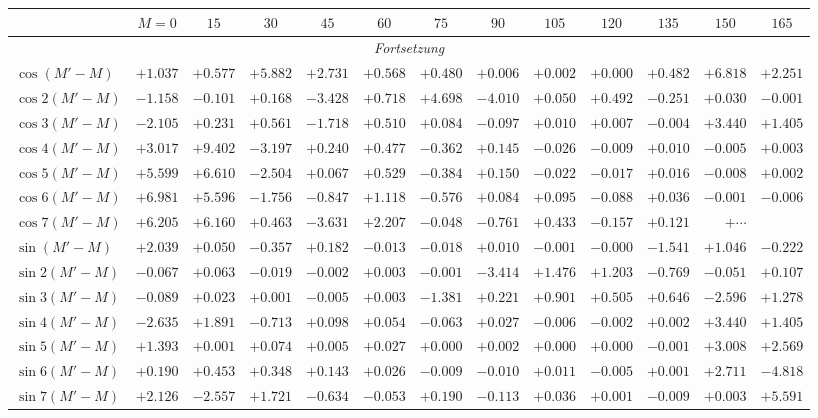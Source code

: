 \documentclass[12pt,a4paper]{article}
\begin{document}
\small
\begin{longtable}{@{}l|rrrrrrrrrrrr@{}}
\multicolumn{1}{c|}{} & \multicolumn{1}{c}{$M=0$} & \multicolumn{1}{c}{$15$} & \multicolumn{1}{c}{$30$} & \multicolumn{1}{c}{$45$} & \multicolumn{1}{c}{$60$} & \multicolumn{1}{c}{$75$} & \multicolumn{1}{c}{$90$} & \multicolumn{1}{c}{$105$} & \multicolumn{1}{c}{$120$} & \multicolumn{1}{c}{$135$} & \multicolumn{1}{c}{$150$} & \multicolumn{1}{c}{$165$}\\
\midrule
\endfirsthead
\multicolumn{13}{c}{\textit{Fortsetzung}}\\
\midrule
\endhead
$\cos(M'-M)$ & $+1.037$ & $+0.577$ & $+5.882$ & $+2.731$ & $+0.568$ & $+0.480$ & $+0.006$ & $+0.002$ & $+0.000$ & $+0.482$ & $+6.818$ & $+2.251$\\
$\cos 2(M'-M)$ & $-1.158$ & $-0.101$ & $+0.168$ & $-3.428$ & $+0.718$ & $+4.698$ & $-4.010$ & $+0.050$ & $+0.492$ & $-0.251$ & $+0.030$ & $-0.001$\\
$\cos 3(M'-M)$ & $-2.105$ & $+0.231$ & $+0.561$ & $-1.718$ & $+0.510$ & $+0.084$ & $-0.097$ & $+0.010$ & $+0.007$ & $-0.004$ & $+3.440$ & $+1.405$\\
$\cos 4(M'-M)$ & $+3.017$ & $+9.402$ & $-3.197$ & $+0.240$ & $+0.477$ & $-0.362$ & $+0.145$ & $-0.026$ & $-0.009$ & $+0.010$ & $-0.005$ & $+0.003$\\
$\cos 5(M'-M)$ & $+5.599$ & $+6.610$ & $-2.504$ & $+0.067$ & $+0.529$ & $-0.384$ & $+0.150$ & $-0.022$ & $-0.017$ & $+0.016$ & $-0.008$ & $+0.002$\\
$\cos 6(M'-M)$ & $+6.981$ & $+5.596$ & $-1.756$ & $-0.847$ & $+1.118$ & $-0.576$ & $+0.084$ & $+0.095$ & $-0.088$ & $+0.036$ & $-0.001$ & $-0.006$\\
$\cos 7(M'-M)$ & $+6.205$ & $+6.160$ & $+0.463$ & $-3.631$ & $+2.207$ & $-0.048$ & $-0.761$ & $+0.433$ & $-0.157$ & $+0.121$ & $+\cdots$ & \\
\midrule
$\sin(M'-M)$ & $+2.039$ & $+0.050$ & $-0.357$ & $+0.182$ & $-0.013$ & $-0.018$ & $+0.010$ & $-0.001$ & $-0.000$ & $-1.541$ & $+1.046$ & $-0.222$\\
$\sin 2(M'-M)$ & $-0.067$ & $+0.063$ & $-0.019$ & $-0.002$ & $+0.003$ & $-0.001$ & $-3.414$ & $+1.476$ & $+1.203$ & $-0.769$ & $-0.051$ & $+0.107$\\
$\sin 3(M'-M)$ & $-0.089$ & $+0.023$ & $+0.001$ & $-0.005$ & $+0.003$ & $-1.381$ & $+0.221$ & $+0.901$ & $+0.505$ & $+0.646$ & $-2.596$ & $+1.278$\\
$\sin 4(M'-M)$ & $-2.635$ & $+1.891$ & $-0.713$ & $+0.098$ & $+0.054$ & $-0.063$ & $+0.027$ & $-0.006$ & $-0.002$ & $+0.002$ & $+3.440$ & $+1.405$\\
$\sin 5(M'-M)$ & $+1.393$ & $+0.001$ & $+0.074$ & $+0.005$ & $+0.027$ & $+0.000$ & $+0.002$ & $+0.000$ & $+0.000$ & $-0.001$ & $+3.008$ & $+2.569$\\
$\sin 6(M'-M)$ & $+0.190$ & $+0.453$ & $+0.348$ & $+0.143$ & $+0.026$ & $-0.009$ & $-0.010$ & $+0.011$ & $-0.005$ & $+0.001$ & $+2.711$ & $-4.818$\\
$\sin 7(M'-M)$ & $+2.126$ & $-2.557$ & $+1.721$ & $-0.634$ & $-0.053$ & $+0.190$ & $-0.113$ & $+0.036$ & $+0.001$ & $-0.009$ & $+0.003$ & $+5.591$\\
\bottomrule
\end{longtable}
\end{document}
